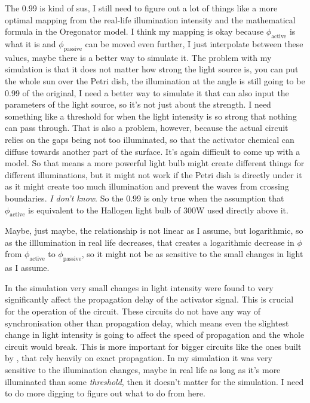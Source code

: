 The 0.99 is kind of sus, I still need to figure out a lot of things like a more optimal mapping from the real-life illumination intensity and the mathematical formula in the Oregonator model. I think my mapping is okay because $\phi_{\text{active}}$ is what it is and $\phi_{\text{passive}}$ can be moved even further, I just interpolate between these values, maybe there is a better way to simulate it. The problem with my simulation is that it does not matter how strong the light source is, you can put the whole sun over the Petri dish, the illumination at the angle is still going to be 0.99 of the original, I need a better way to simulate it that can also input the parameters of the light source, so it's not just about the strength. I need something like a threshold for when the light intensity is so strong that nothing can pass through. That is also a problem, however, because the actual circuit relies on the gaps being not too illuminated, so that the activator chemical can diffuse towards another part of the surface. It's again difficult to come up with a model. 
So that means a more powerful light bulb might create different things for different illuminations, but it might not work if the Petri dish is directly under it as it might create too much illumination and prevent the waves from crossing boundaries. \textit{I don't know}. So the 0.99 is only true when the assumption that $\phi_{\text{active}}$ is equivalent to the Hallogen light bulb of 300W used directly above it.

Maybe, just maybe, the relationship is not linear as I assume, but logarithmic, so as the illlumination in real life decreases, that creates a logarithmic decrease in $\phi$ from $\phi_{\text{active}}$ to $\phi_{\text{passive}}$, so it might not be as sensitive to the small changes in light as I assume. 

In the simulation very small changes in light intensity were found to very significantly affect the propagation delay of the activator signal. This is crucial for the operation of the circuit. These circuits do not have any way of synchronisation other than propagation delay, which means even the slightest change in light intensity is going to affect the speed of propagation and the whole circuit would break. This is more important for bigger circuits like the ones built by \cite{StovoldJames2019RaGI}, that rely heavily on exact propagation. 
In my simulation it was very sensitive to the illumination changes, maybe in real life as long as it's more illuminated than some \textit{threshold}, then it doesn't matter for the simulation. I need to do more digging to figure out what to do from here.






